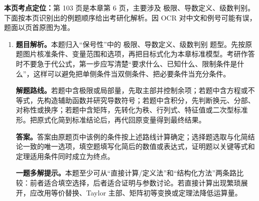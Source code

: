 \begin{solutionblock}
\textbf{本页考点定位：}第 103 页是本章第 6 页，主要涉及 极限、导数定义、级数判别。下面按本页识别出的例题顺序给出考研化解析。因 OCR 对中文和例号可能有误，题面以页首原图为准。

\begin{enumerate}[label=\textbf{例\arabic*.}, leftmargin=2.4em]

\item \textbf{题目解析。}本题归入“保号性”中的 极限、导数定义、级数判别 题型。先按原题图片核准条件、变量范围和选项，再把目标式化为本章标准模型。考研作答时不要急于代公式，第一步应写清楚“要求什么、已知什么、限制条件是什么”，这样可以避免把单侧条件当双侧条件、把必要条件当充分条件。

\textbf{解题路线。}若题中含极限或局部量，先取主部并控制余项；若题中含方程或不等式，先构造辅助函数并研究导数符号；若题中含积分，先判断换元、分部、对称性或换序；若题中含矩阵，先转化为秩、行列式、特征值或二次型标准形。把原式化简到标准结论后，再代回原变量得到最终结果。

\textbf{答案。}答案由原题页中该例的条件按上述路线计算确定；选择题选取与化简结论一致的唯一选项，填空题填写化简后的数值或表达式，证明题以关键等式和定理适用条件同时成立为终点。

\textbf{一题多解提示。}本题至少可从“直接计算/定义法”和“结构化方法”两条路比较：前者适合填空选择，后者适合证明与参数讨论。若直接计算出现繁琐展开，应改用等价替换、Taylor 主部、矩阵初等变换或定理法降低运算量。

\end{enumerate}
\end{solutionblock}


